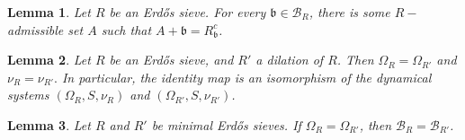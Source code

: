 \documentclass[10pt,a4paper]{amsart}
\newtheorem{lemma}{Lemma}
\newcommand{\cb}{\mathcal{B}}
\newcommand{\gb}{\mathfrak{b}}
\begin{document}
			\begin{lemma}
				\label{lm: there are admissible representatives of R_gb^c  }
				Let $R$ be an Erdős sieve. For every $\gb \in \cb_R$, there is some $R-$admissible set $A$ such that $A+\gb = R_\gb^c$. 
			\end{lemma}

			\begin{lemma}
				\label{lm: isomorphism of dynamical systems for contraction dilation}
				Let $R$ be an Erdős sieve, and $R'$ a dilation of $R$. Then $\Omega_R = \Omega_{R'}$ and $\nu_R = \nu_{R'}.$ In particular, the identity map is an isomorphism of the dynamical systems $(\Omega_{R},S,\nu_{R})$ and $(\Omega_{R'},S,\nu_{R'})$.
			\end{lemma}

			\begin{lemma}
				\label{lm: OmegaR =omegar' implies equality of base}
				Let $R$ and $R'$ be minimal Erdős sieves. If $\Omega_{R} = \Omega_{R'}$, then $\cb_R = \cb_{R'}$. 
			\end{lemma}
\end{document}
